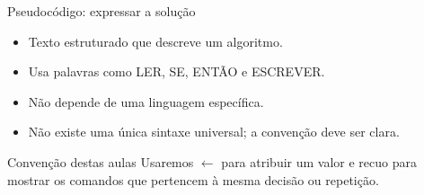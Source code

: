 \begin{frame}[t]{Pseudocódigo: expressar a solução}
\begin{itemize}
\item Texto estruturado que descreve um algoritmo.
\item Usa palavras como LER, SE, ENTÃO e ESCREVER.
\item Não depende de uma linguagem específica.
\item Não existe uma única sintaxe universal; a convenção deve ser clara.
\end{itemize}
\begin{block}{Convenção destas aulas}
Usaremos $\leftarrow$ para atribuir um valor e recuo para mostrar os comandos que pertencem à mesma decisão ou repetição.
\end{block}
\end{frame}
